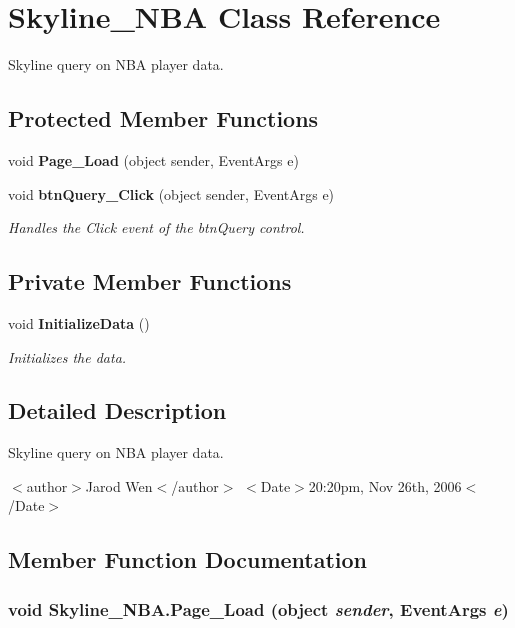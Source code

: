 \section{Skyline\_\-NBA Class Reference}
\label{class_skyline___n_b_a}
Skyline query on NBA player data.  


\subsection*{Protected Member Functions}
\begin{CompactItemize}
\item 
void {\bf Page\_\-Load} (object sender, Event\-Args e)
\item 
void {\bf btn\-Query\_\-Click} (object sender, Event\-Args e)
\begin{CompactList}\small\item\em Handles the Click event of the btn\-Query control. \item\end{CompactList}\end{CompactItemize}
\subsection*{Private Member Functions}
\begin{CompactItemize}
\item 
void {\bf Initialize\-Data} ()
\begin{CompactList}\small\item\em Initializes the data. \item\end{CompactList}\end{CompactItemize}


\subsection{Detailed Description}
Skyline query on NBA player data. 

$<$author$>$Jarod Wen$<$/author$>$ $<$Date$>$20:20pm, Nov 26th, 2006$<$/Date$>$ 



\subsection{Member Function Documentation}
\subsubsection{\setlength{\rightskip}{0pt plus 5cm}void Skyline\_\-NBA.Page\_\-Load (object {\em sender}, Event\-Args {\em e})\hspace{0.3cm}{\tt  [protected]}}\label{class_skyline___n_b_a_9612cf97adf08f20366bc8dba30c6099}


